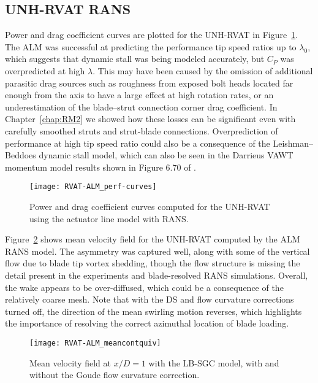 \subsection{UNH-RVAT RANS}

Power and drag coefficient curves are plotted for the UNH-RVAT in
Figure~\ref{fig:RVAT-ALM-perf-curves}. The ALM was successful at predicting the
performance tip speed ratios up to $\lambda_0$, which suggests that dynamic
stall was being modeled accurately, but $C_P$ was overpredicted at high
$\lambda$. This may have been caused by the omission of additional parasitic
drag sources such as roughness from exposed bolt heads located far enough from
the axis to have a large effect at high rotation rates, or an underestimation of
the blade--strut connection corner drag coefficient. In Chapter~\ref{chap:RM2}
we showed how these losses can be significant even with carefully smoothed
struts and strut-blade connections. Overprediction of performance at high tip
speed ratio could also be a consequence of the Leishman--Beddoes dynamic stall
model, which can also be seen in the Darrieus VAWT momentum model results shown
in Figure 6.70 of \cite{Para2002}.

\begin{figure}
    \centering
    
    \texttt{[image: RVAT-ALM\_perf-curves]}
    
    \caption{Power and drag coefficient curves computed for the UNH-RVAT using
        the actuator line model with RANS.}
    
    \label{fig:RVAT-ALM-perf-curves}
\end{figure}

Figure~\ref{fig:RVAT-ALM-meancontquiv} shows mean velocity field for the
UNH-RVAT computed by the ALM RANS model. The asymmetry was captured well, along
with some of the vertical flow due to blade tip vortex shedding, though the flow
structure is missing the detail present in the experiments and blade-resolved
RANS simulations. Overall, the wake appears to be over-diffused, which could be
a consequence of the relatively coarse mesh. Note that with the DS and flow
curvature corrections turned off, the direction of the mean swirling motion
reverses, which highlights the importance of resolving the correct azimuthal
location of blade loading.

\begin{figure}
    \centering

    \texttt{[image: RVAT-ALM\_meancontquiv]}
    
    \caption{Mean velocity field at $x/D=1$ with the LB-SGC model, with and
        without the Goude flow curvature correction.}
    
    \label{fig:RVAT-ALM-meancontquiv}
\end{figure}

